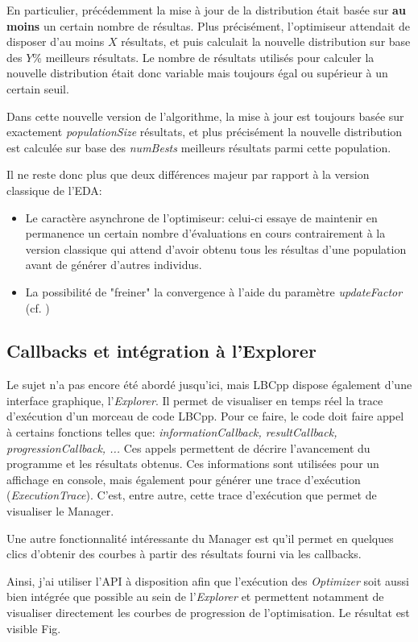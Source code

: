 \documentclass[a4paper, 11pt]{article}
\begin{document}
En particulier, précédemment la mise à jour de la distribution était basée sur \textbf{au moins} un certain nombre de résultas. Plus précisément, l'optimiseur attendait de disposer d'au moins $X$ résultats, %
et puis calculait la nouvelle distribution sur base des $Y$\% meilleurs résultats. Le nombre de résultats utilisés pour calculer la nouvelle distribution était donc variable mais toujours égal ou supérieur à un certain seuil.

Dans cette nouvelle version de l'algorithme, la mise à jour est toujours basée sur exactement \textit{populationSize} résultats, et plus précisément la nouvelle distribution est calculée sur base des \textit{numBests} meilleurs résultats parmi cette population. 

Il ne reste donc plus que deux différences majeur par rapport à la version classique de l'EDA:
\begin{itemize}
\item Le caractère asynchrone de l'optimiseur: celui-ci essaye de maintenir en permanence un certain nombre d'évaluations en cours contrairement à la version classique qui attend d'avoir obtenu tous les résultas d'une population avant de générer d'autres individus.
\item La possibilité de "freiner" la convergence à l'aide du paramètre \textit{updateFactor} (cf. ) %
\end{itemize}

\subsection{Callbacks et intégration à l'Explorer}
Le sujet n'a pas encore été abordé jusqu'ici, mais LBCpp dispose également d'une interface graphique, l'\textit{Explorer}. Il permet de visualiser en temps réel la trace d'exécution d'un morceau de code LBCpp. Pour ce faire, le code doit faire appel à certains fonctions telles que: \textit{informationCallback, resultCallback, progressionCallback, ...} Ces appels permettent de décrire l'avancement du programme et les résultats obtenus. Ces informations sont utilisées pour un affichage en console, mais également pour générer une trace d'exécution (\textit{ExecutionTrace}). C'est, entre autre, cette trace d'exécution que permet de visualiser le Manager. 

Une autre fonctionnalité intéressante du Manager est qu'il permet en quelques clics d'obtenir des courbes à partir des résultats fourni via les callbacks.

Ainsi, j'ai utiliser l'API à disposition afin que l'exécution des \textit{Optimizer} soit aussi bien intégrée que possible au sein de l'\textit{Explorer} et permettent notamment de visualiser directement les courbes de progression de l'optimisation. Le résultat est visible Fig. %
\end{document}
